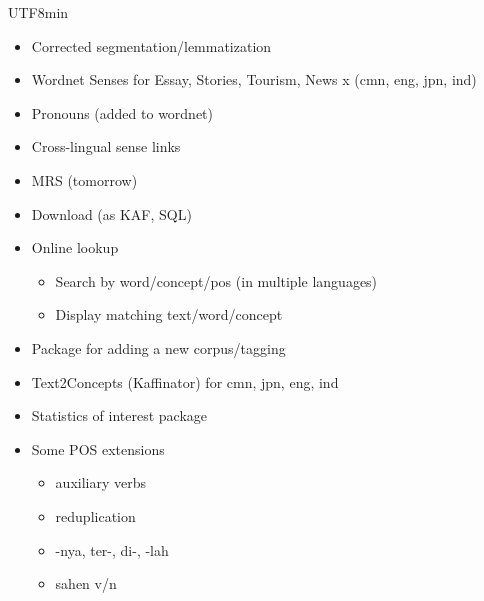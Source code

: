 \documentclass[25pt,landscape,headrule,footrule,dvips]{foils}
\newcommand{\emp}[1]{\textcolor{red}{#1}}
\newcommand{\myslide}[1]{\foilhead[-25mm]{\raisebox{12mm}[0mm]{\emp{#1}}}}
\begin{document}
\begin{CJK}{UTF8}{min}
\myslide{Tagging Goals}
\begin{itemize}
\item Corrected segmentation/lemmatization
\item Wordnet Senses for Essay, Stories, Tourism, News x (cmn, eng, jpn, ind)
\item Pronouns (added to wordnet)
\item Cross-lingual sense links
\item MRS (tomorrow)
\end{itemize}

\myslide{Accessibility Goals}
\begin{itemize}
\item Download (as KAF, SQL)
\item Online lookup
  \begin{itemize}
  \item Search by word/concept/pos (in multiple languages)
  \item Display matching text/word/concept
  \end{itemize}
\item Package for adding a new corpus/tagging
\item Text2Concepts (Kaffinator) for cmn, jpn, eng, ind
\item Statistics of interest package
\end{itemize}

\myslide{Interesting Things}
\begin{itemize}
\item Some POS extensions
  \begin{itemize}
  \item auxiliary verbs
  \item reduplication
  \item -nya, ter-, di-, -lah
  \item sahen v/n
  \end{itemize}
\end{itemize}

\myslide{Data Format}


\end{CJK}
\end{document}
